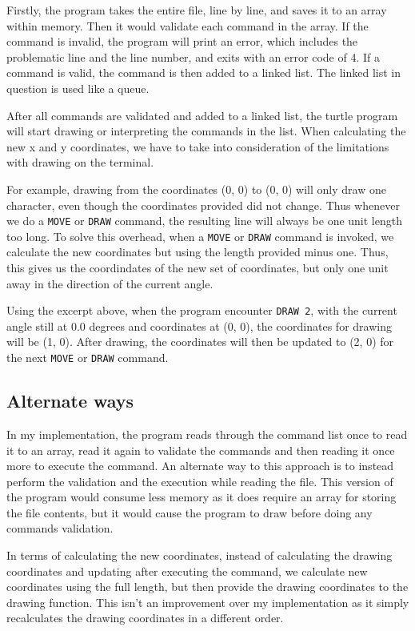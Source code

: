 \documentclass[a4paper, 12pt, titlepage]{article}
\newcommand{\code}[1]{\small\texttt{#1}\normalsize}
\begin{document}
Firstly, the program takes the entire file, line by line, and saves it to
an array within memory. Then it would validate each command in the array. 
If the command is invalid, the program will print an error, which includes 
the problematic line and the line number, and exits with an error code of 
4. If a command is valid, the command is then added to a linked list. The 
linked list in question is used like a queue.

After all commands are validated and added to a linked list, the turtle 
program will start drawing or interpreting the commands in the list. When 
calculating the new x and y coordinates, we have to take into consideration 
of the limitations with drawing on the terminal.

For example, drawing from the coordinates (0, 0) to (0, 0) will only draw 
one character, even though the coordinates provided did not change. 
Thus whenever we do a \code{MOVE} or \code{DRAW} command, the resulting 
line will always be one unit length too long. To solve this overhead, 
when a \code{MOVE} or \code{DRAW} command is invoked, we calculate the 
new coordinates but using the length provided minus one. Thus, this gives 
us the coordindates of the new set of coordinates, but only one unit away 
in the direction of the current angle.

Using the excerpt above, when the program encounter \code{DRAW 2}, 
with the current angle still at 0.0 degrees and coordinates at (0, 0), 
the coordinates for drawing will be (1, 0). After drawing, the coordinates 
will then be updated to (2, 0) for the next \code{MOVE} or \code{DRAW} 
command.

\subsection{Alternate ways}

In my implementation, the program reads through the command list once to 
read it to an array, read it again to validate the commands and then 
reading it once more to execute the command. An alternate way to this 
approach is to instead perform the validation and the execution while reading 
the file. This version of the program would consume less memory as it does 
require an array for storing the file contents, but it would cause the 
program to draw before doing any commands validation.

In terms of calculating the new coordinates, instead of calculating the 
drawing coordinates and updating after executing the command, we calculate 
new coordinates using the full length, but then provide the drawing 
coordinates to the drawing function. This isn't an improvement over my 
implementation as it simply recalculates the drawing coordinates in a 
different order.
\end{document}

